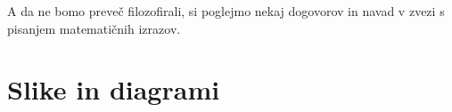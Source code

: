 A da ne bomo preveč filozofirali, si poglejmo nekaj dogovorov in navad v zvezi s pisanjem
matematičnih izrazov.




\section{Slike in diagrami}
\label{sec:slike-in-diagrami}






